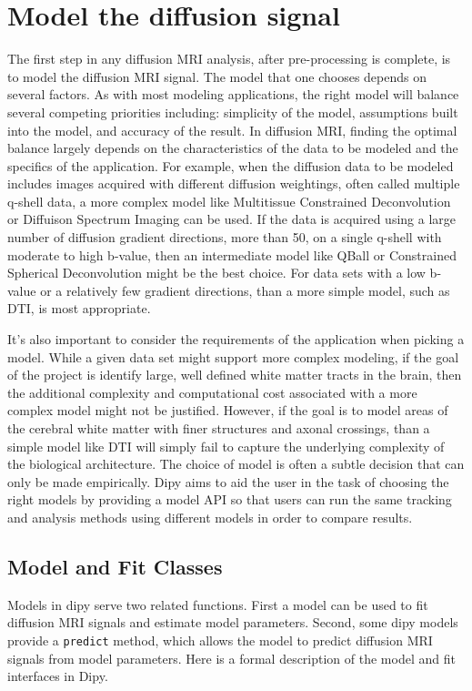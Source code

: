 \section{Model the diffusion signal}
The first step in any diffusion MRI analysis, after pre-processing is complete, is to model the diffusion MRI signal. The model that one chooses depends on several factors. As with most modeling applications, the right model will balance several competing priorities including: simplicity of the model, assumptions built into the model, and accuracy of the result. In diffusion MRI, finding the optimal balance largely depends on the characteristics of the data to be modeled and the specifics of the application. For example, when the diffusion data to be modeled includes images acquired with different diffusion weightings, often called multiple q-shell data, a more complex model like Multitissue Constrained Deconvolution or Diffuison Spectrum Imaging can be used. If the data is acquired using a large number of diffusion gradient directions, more than 50, on a single q-shell with moderate to high b-value, then an intermediate model like QBall or Constrained Spherical Deconvolution might be the best choice. For data sets with a low b-value or a relatively few gradient directions, than a more simple model, such as DTI, is most appropriate. 

It's also important to consider the requirements of the application when picking a model. While a given data set might support more complex modeling, if the goal of the project is identify large, well defined white matter tracts in the brain, then the additional complexity and computational cost associated with a more complex model might not be justified. However, if the goal is to model areas of the cerebral white matter with finer structures and axonal crossings, than a simple model like DTI will simply fail to capture the underlying complexity of the biological architecture. The choice of model is often a subtle decision that can only be made empirically. Dipy aims to aid the user in the task of choosing the right models by providing a model API so that users can run the same tracking and analysis methods using different models in order to compare results.

\subsection{Model and Fit Classes}
Models in dipy serve two related functions. First a model can be used to fit diffusion MRI signals and estimate model parameters. Second, some dipy models provide a \verb|predict| method, which allows the model to predict diffusion MRI signals from model parameters. Here is a formal description of the model and fit interfaces in Dipy.

